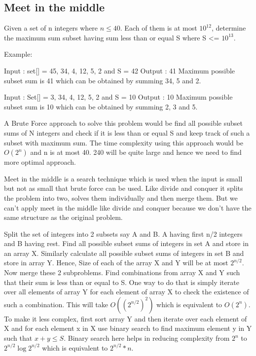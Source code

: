 \documentclass[8pt, a4paper, oneside, twocolumn]{extarticle}
\begin{document}
\subsection{Meet in the middle}
Given a set of n integers where $n \leq 40$. Each of them is at most $10^{12}$, determine the maximum sum subset having sum less than or equal S where S <= $10^{13}$.

Example:

Input  : set[] = {45, 34, 4, 12, 5, 2} and S = 42
Output : 41
Maximum possible subset sum is 41 which can be obtained by summing 34, 5 and 2.

Input  : Set[] = {3, 34, 4, 12, 5, 2} and S = 10
Output : 10
Maximum possible subset sum is 10 which can be obtained by summing 2, 3 and 5.

A Brute Force approach to solve this problem would be find all possible subset sums of N integers and check if it is less than or equal S and keep track of such a subset with maximum sum. The time complexity using this approach would be $O(2^n)$ and n is at most 40. 240 will be quite large and hence we need to find more optimal approach.

Meet in the middle is a search technique which is used when the input is small but not as small that brute force can be used. Like divide and conquer it splits the problem into two, solves them individually and then merge them. But we can’t apply meet in the middle like divide and conquer because we don’t have the same structure as the original problem.

    Split the set of integers into 2 subsets say A and B. A having first n/2 integers and B having rest.
    Find all possible subset sums of integers in set A and store in an array X. Similarly calculate all possible subset sums of integers in set B and store in array Y. Hence, Size of each of the array X and Y will be at most $2^{n/2}$.
    Now merge these 2 subproblems. Find combinations from array X and Y such that their sum is less than or equal to S.
        One way to do that is simply iterate over all elements of array Y for each element of array X to check the existence of such a combination. This will take $O((2^{n/2})^2)$ which is equivalent to $O(2^n)$.
        To make it less complex, first sort array Y and then iterate over each element of X and for each element x in X use binary search to find maximum element y in Y such that $x + y \leq S$.
        Binary search here helps in reducing complexity from $2^n$ to $2^{n/2} \log{2^{n/2}}$ which is equivalent to $2^{n/2} *n$.
\end{document}
